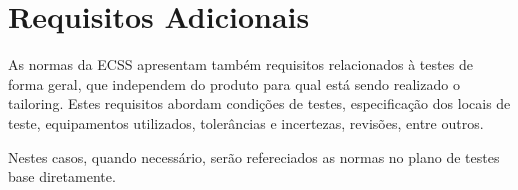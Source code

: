 \section{Requisitos Adicionais}


As normas da \gls{ECSS} apresentam também requisitos relacionados à testes de forma geral, que independem do produto para qual está sendo realizado o tailoring.
Estes requisitos abordam condições de testes, especificação dos locais de teste, equipamentos utilizados, tolerâncias e incertezas, revisões, entre outros.

Nestes casos, quando necessário, serão refereciados as normas no plano de testes base diretamente.

